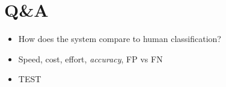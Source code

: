 \documentclass{beamer}
\begin{document}
\section{Q\&A}
\begin{frame}
  \begin{itemize}
	    \item How does the system compare to human classification?
	    \item Speed, cost, effort, \emph{accuracy}, FP vs FN
	    \item TEST
  \end{itemize}
\end{frame}
\end{document}
